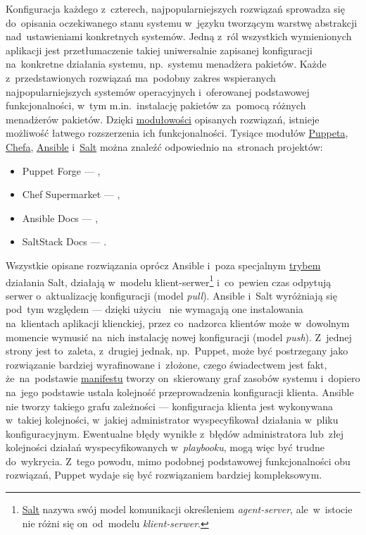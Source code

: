 \documentclass[thesis]{subfiles}
\begin{document}
Konfiguracja każdego z~czterech, najpopularniejszych rozwiązań sprowadza się do~opisania oczekiwanego stanu systemu w~języku tworzącym warstwę abstrakcji nad~ustawieniami konkretnych systemów. Jedną z~ról wszystkich wymienionych aplikacji jest przetłumaczenie takiej uniwersalnie zapisanej konfiguracji na~konkretne działania systemu, np.~systemu menadżera pakietów. Każde z~przedstawionych rozwiązań ma~podobny zakres wspieranych najpopularniejszych systemów operacyjnych i~oferowanej podstawowej funkcjonalności, w~tym m.in.~instalację pakietów za~pomocą różnych menadżerów pakietów. Dzięki \href{https://sjp.pwn.pl/poradnia/haslo/modularny-modulowy-i-nie-tylko;3162.html}{modułowości} opisanych rozwiązań, istnieje możliwość łatwego rozszerzenia ich funkcjonalności. Tysiące modułów \hyperref[sec:puppet]{Puppeta}, \hyperref[sec:chef]{Chefa}, \hyperref[sec:ansible]{Ansible} i~\hyperref[sec:salt]{Salt} można znaleźć odpowiednio na~stronach projektów:\mynobreakpar
\begin{itemize}
	\item Puppet Forge --- ,
	\item Chef Supermarket --- ,
	\item Ansible Docs --- ,
	\item SaltStack Docs --- .
\end{itemize}

Wszystkie opisane rozwiązania oprócz Ansible i~poza specjalnym \href{https://docs.saltstack.com/en/latest/topics/ssh/}{trybem} działania Salt, działają w~modelu klient-serwer\footnote{\hyperref[sec:salt]{Salt} nazywa swój model komunikacji określeniem \emph{agent-server}, ale~w~istocie nie różni się on~od~modelu \emph{klient-serwer}.} i~co~pewien czas odpytują serwer o~aktualizację konfiguracji (model \emph{pull}). Ansible i~Salt wyróżniają się pod~tym względem --- dzięki użyciu~\ssh{} nie wymagają one instalowania na~klientach aplikacji klienckiej, przez co~nadzorca klientów może w~dowolnym momencie wymusić na~nich instalację nowej konfiguracji (model \emph{push}). Z~jednej strony jest to~zaleta, z~drugiej jednak, np.~Puppet, może być postrzegany jako rozwiązanie bardziej wyrafinowane i~złożone, czego świadectwem jest fakt, że~na~podstawie \hyperref[sec:puppet]{manifestu} tworzy on~skierowany graf zasobów systemu i~dopiero na~jego podstawie ustala kolejność przeprowadzenia konfiguracji klienta. Ansible nie tworzy takiego grafu zależności --- konfiguracja klienta jest wykonywana w~takiej kolejności, w~jakiej administrator wyspecyfikował działania w~pliku konfiguracyjnym. Ewentualne błędy wynikłe z~błędów administratora lub~złej kolejności działań wyspecyfikowanych w~\emph{playbooku}, mogą więc być trudne do~wykrycia. Z~tego powodu, mimo podobnej podstawowej funkcjonalności obu rozwiązań, Puppet wydaje się być rozwiązaniem bardziej kompleksowym.
\end{document}
